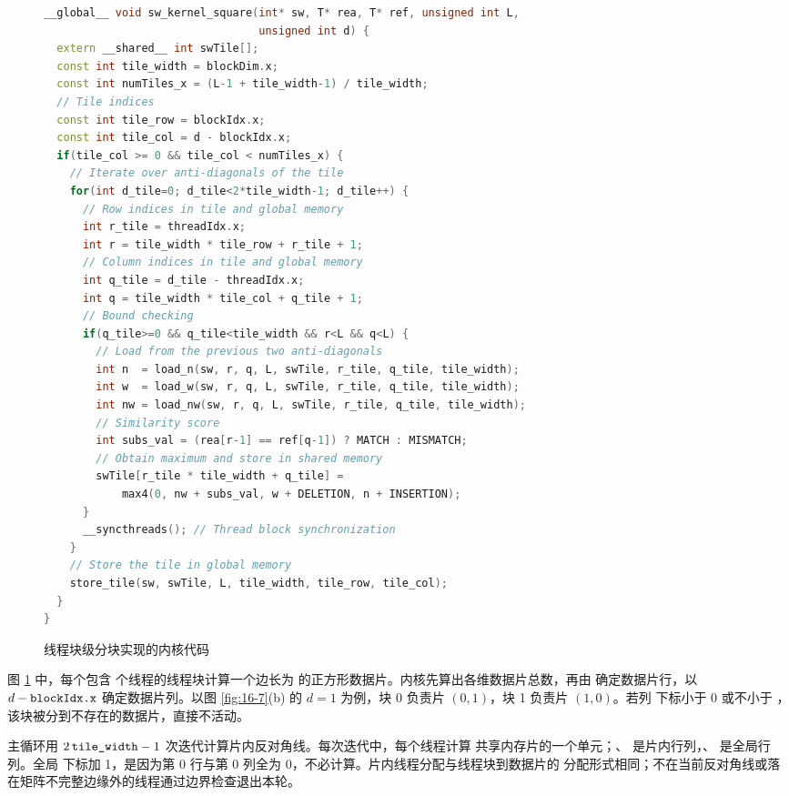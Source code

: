 \begin{figure}[htbp]
  \centering
  \begin{minipage}{0.99\textwidth}
  \begin{lstlisting}[language=C++,basicstyle=\ttfamily\scriptsize]
__global__ void sw_kernel_square(int* sw, T* rea, T* ref, unsigned int L,
                                 unsigned int d) {
  extern __shared__ int swTile[];
  const int tile_width = blockDim.x;
  const int numTiles_x = (L-1 + tile_width-1) / tile_width;
  // Tile indices
  const int tile_row = blockIdx.x;
  const int tile_col = d - blockIdx.x;
  if(tile_col >= 0 && tile_col < numTiles_x) {
    // Iterate over anti-diagonals of the tile
    for(int d_tile=0; d_tile<2*tile_width-1; d_tile++) {
      // Row indices in tile and global memory
      int r_tile = threadIdx.x;
      int r = tile_width * tile_row + r_tile + 1;
      // Column indices in tile and global memory
      int q_tile = d_tile - threadIdx.x;
      int q = tile_width * tile_col + q_tile + 1;
      // Bound checking
      if(q_tile>=0 && q_tile<tile_width && r<L && q<L) {
        // Load from the previous two anti-diagonals
        int n  = load_n(sw, r, q, L, swTile, r_tile, q_tile, tile_width);
        int w  = load_w(sw, r, q, L, swTile, r_tile, q_tile, tile_width);
        int nw = load_nw(sw, r, q, L, swTile, r_tile, q_tile, tile_width);
        // Similarity score
        int subs_val = (rea[r-1] == ref[q-1]) ? MATCH : MISMATCH;
        // Obtain maximum and store in shared memory
        swTile[r_tile * tile_width + q_tile] =
            max4(0, nw + subs_val, w + DELETION, n + INSERTION);
      }
      __syncthreads(); // Thread block synchronization
    }
    // Store the tile in global memory
    store_tile(sw, swTile, L, tile_width, tile_row, tile_col);
  }
}
  \end{lstlisting}
  \end{minipage}
  \caption{线程块级分块实现的内核代码}
  \label{fig:16-9}
\end{figure}

图 \ref{fig:16-9} 中，每个包含  个线程的线程块计算一个边长为
 的正方形数据片。内核先算出各维数据片总数，再由
 确定数据片行，以 $d-\code{blockIdx.x}$ 确定数据片列。以图
\ref{fig:16-7}(b) 的 $d=1$ 为例，块 0 负责片 $(0,1)$，块 1 负责片 $(1,0)$。若列
下标小于 0 或不小于 ，该块被分到不存在的数据片，直接不活动。

主循环用 $2\,\code{tile_width}-1$ 次迭代计算片内反对角线。每次迭代中，每个线程计算
共享内存片的一个单元；、 是片内行列，、
是全局行列。全局
下标加 1，是因为第 0 行与第 0 列全为 0，不必计算。片内线程分配与线程块到数据片的
分配形式相同；不在当前反对角线或落在矩阵不完整边缘外的线程通过边界检查退出本轮。

